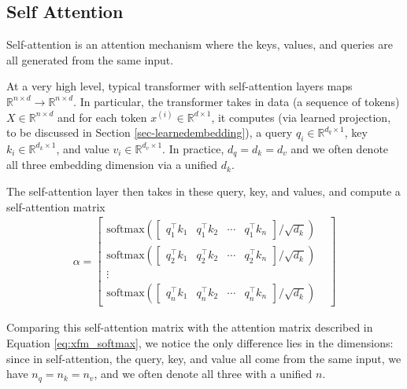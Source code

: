 \subsection{Self Attention}
Self-attention is an attention mechanism where the keys, values, and queries are all generated from the same input.

At a very high level, typical transformer with self-attention layers maps $\mathbb{R}^{n\times d} \longrightarrow \mathbb{R}^{n\times d}$. In particular, the transformer takes in data (a sequence of tokens) $X\in \mathbb{R}^{n\times d}$ and for each token $x^{(i)}\in \mathbb{R}^{d\times 1}$, it computes (via learned projection, to be discussed in Section \ref{sec-learnedembedding}), a query $q_i \in \mathbb{R}^{d_q\times 1}$, key $k_{i} \in \mathbb{R}^{d_k\times 1}$, and value $v_{i} \in \mathbb{R}^{d_v\times 1}$. In practice, $d_q=d_k=d_v$ and we often denote all three embedding dimension via a unified $d_k.$

The self-attention layer then takes in these query, key, and values, and compute a self-attention matrix
\begin{eqnarray}
\alpha = \begin{bmatrix}
    \text{softmax}\left( \begin{bmatrix}
                           q_1^\top k_1 & q_1^\top k_2 & \cdots & q_1^\top k_{n}
                         \end{bmatrix} / \sqrt{d_k} \right) \\
    \text{softmax}\left( \begin{bmatrix}
                           q_2^\top k_1 & q_2^\top k_2 & \cdots & q_2^\top k_{n}
                         \end{bmatrix} / \sqrt{d_k} \right) \\
    \vdots &                                                                   \\
    \text{softmax}\left( \begin{bmatrix}
                           q_{n}^\top k_1 & q_{n}^\top k_2 & \cdots & q_{n}^\top k_{n}
                         \end{bmatrix} / \sqrt{d_k} \right)
  \end{bmatrix}
\end{eqnarray}\label{eq:self_softmax}

Comparing this self-attention matrix with the attention matrix described in Equation \ref{eq:xfm_softmax}, we notice the only difference lies in the dimensions: since in self-attention, the query, key, and value all come from the same input, we have $n_q=n_k=n_v$, and we often denote all three with a unified $n$.

